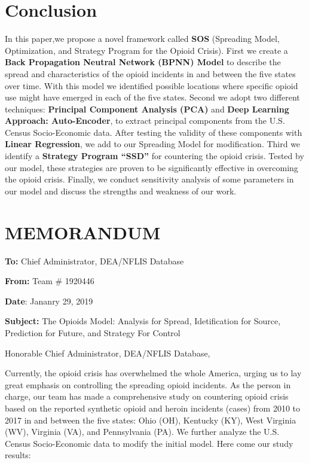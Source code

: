 \documentclass{mcmthesis}
\begin{document}
\section{Conclusion} \label{Sec-Conclusion}
In this paper,we propose a novel framework called \textbf{SOS} (Spreading Model, Optimization, and Strategy Program for the Opioid Crisis). First we create a \textbf{Back Propagation Neutral Network  (BPNN) Model} to describe the spread and characteristics of the opioid incidents in and between the five states over time. With this model we identified possible locations where specific opioid use might have emerged in each of the five states. Second we adopt two different techniques: \textbf{Principal Component Analysis (PCA)} and \textbf{Deep Learning Approach: Auto-Encoder}, to extract principal components from the U.S. Census Socio-Economic data. After testing the validity of these components with \textbf{Linear Regression},  we add to our Spreading Model for modification. Third we identify a \textbf{Strategy Program ``SSD''} for countering the opioid crisis. Tested by our model, these strategies are proven to be significantly effective in overcoming the opioid crisis. Finally, we conduct sensitivity analysis of some parameters in our model and discuss the strengths and weakness of our work.

\newpage
\section*{MEMORANDUM} 

\noindent\textbf{To:} Chief Administrator, DEA/NFLIS Database

\noindent\textbf{From:} Team \# 1920446

\noindent\textbf{Date}: Jananry 29, 2019

\noindent\textbf{Subject:} The Opioids Model: Analysis for Spread, Idetification for Source, Prediction for Future, and Strategy For Control

Honorable Chief Administrator, DEA/NFLIS Database, 

Currently, the opioid crisis has overwhelmed the whole America, urging us to lay great emphasis on controlling the spreading opioid incidents. As the person in charge, our team has made a comprehensive study on countering opioid crisis based on the reported synthetic opioid and heroin incidents (cases) from 2010 to 2017 in and between the five states: Ohio (OH), Kentucky (KY), West Virginia (WV), Virginia (VA), and Pennsylvania (PA). We further analyze the U.S. Census Socio-Economic data to modify the initial model. Here come our study results:
\end{document}

